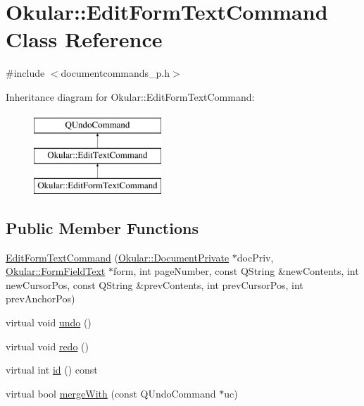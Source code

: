 \hypertarget{classOkular_1_1EditFormTextCommand}{\section{Okular\+:\+:Edit\+Form\+Text\+Command Class Reference}
\label{classOkular_1_1EditFormTextCommand}
}


{\ttfamily \#include $<$documentcommands\+\_\+p.\+h$>$}

Inheritance diagram for Okular\+:\+:Edit\+Form\+Text\+Command\+:\begin{figure}[H]
\begin{center}
\leavevmode
\includegraphics[height=3.000000cm]{classOkular_1_1EditFormTextCommand}
\end{center}
\end{figure}
\subsection*{Public Member Functions}
\begin{DoxyCompactItemize}
\item 
\hyperlink{classOkular_1_1EditFormTextCommand_aaea9c864d00433d16430159d44629c48}{Edit\+Form\+Text\+Command} (\hyperlink{classOkular_1_1DocumentPrivate}{Okular\+::\+Document\+Private} $\ast$doc\+Priv, \hyperlink{classOkular_1_1FormFieldText}{Okular\+::\+Form\+Field\+Text} $\ast$form, int page\+Number, const Q\+String \&new\+Contents, int new\+Cursor\+Pos, const Q\+String \&prev\+Contents, int prev\+Cursor\+Pos, int prev\+Anchor\+Pos)
\item 
virtual void \hyperlink{classOkular_1_1EditFormTextCommand_a998b93dad578d50e14f12a15eb8ed7c7}{undo} ()
\item 
virtual void \hyperlink{classOkular_1_1EditFormTextCommand_a97d3a59eb9c98790a49ffed2cb8bc140}{redo} ()
\item 
virtual int \hyperlink{classOkular_1_1EditFormTextCommand_a56f76547698a496668fb8b7997509bb3}{id} () const 
\item 
virtual bool \hyperlink{classOkular_1_1EditFormTextCommand_ab02b6f91e22047858b2972b427458481}{merge\+With} (const Q\+Undo\+Command $\ast$uc)
\end{DoxyCompactItemize}
